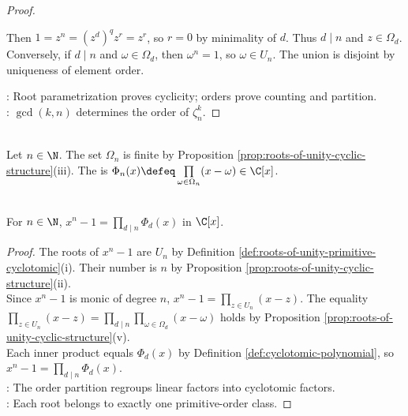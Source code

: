 \begin{proposition}
\begin{proof}
\begin{enumerate}[label=(\roman*)]
Then $1=z^n=(z^d)^qz^r=z^r$, so $r=0$ by minimality of $d$. Thus $d\mid n$ and $z\in\Omega_d$.\\
Conversely, if $d\mid n$ and $\omega\in\Omega_d$, then $\omega^n=1$, so $\omega\in U_n$. The union is disjoint by uniqueness of element order.
\end{enumerate}
: Root parametrization proves cyclicity; orders prove counting and partition.\\
: $\gcd(k,n)$ determines the order of $\zeta_n^k$.
\end{proof}
\end{proposition}

\begin{definition} \label{def:cyclotomic-polynomial} \\
Let $n\in\N$. The set $\Omega_n$ is finite by Proposition \ref{prop:roots-of-unity-cyclic-structure}(iii). The  is $\Phi_n(x)\defeq\prod\limits_{\omega\in\Omega_n}(x-\omega)\in\C[x]$.
\end{definition}

\begin{proposition} \label{prop:roots-of-unity-cyclic-and-cyclotomic-factorization} \\
For $n\in\N$, $x^n-1=\prod\limits_{d\mid n}\Phi_d(x)$ in $\C[x]$.
\begin{proof}
The roots of $x^n-1$ are $U_n$ by Definition \ref{def:roots-of-unity-primitive-cyclotomic}(i). Their number is $n$ by Proposition \ref{prop:roots-of-unity-cyclic-structure}(ii).\\
Since $x^n-1$ is monic of degree $n$, $x^n-1=\prod\limits_{z\in U_n}(x-z)$. The equality $\prod\limits_{z\in U_n}(x-z)=\prod\limits_{d\mid n}\prod\limits_{\omega\in\Omega_d}(x-\omega)$ holds by Proposition \ref{prop:roots-of-unity-cyclic-structure}(v).\\
Each inner product equals $\Phi_d(x)$ by Definition \ref{def:cyclotomic-polynomial}, so $x^n-1=\prod\limits_{d\mid n}\Phi_d(x)$.\\
: The order partition regroups linear factors into cyclotomic factors.\\
: Each root belongs to exactly one primitive-order class.
\end{proof}
\end{proposition}

